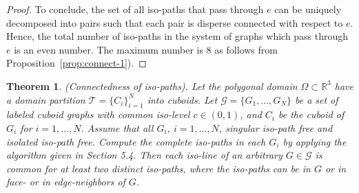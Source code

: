 \documentclass[a4paper,11pt]{article}
\newtheorem{theorem}{Theorem}[section]
\begin{document}
\begin{proof}
To conclude, the set of all iso-paths that pass through $e$ can be uniquely decomposed into pairs
such that each pair is disperse connected with respect to $e$. Hence, the total number of iso-paths in
the system of graphs which pass through $e$ is an even number. The maximum number is 8 as follows
from Proposition~\ref{prop:connect-1}).
\end{proof}

\begin{theorem}\label{thm:connect-4}(Connectedness of iso-paths).
Let the polygonal domain $\Omega\subset\mathbb{R}^3$ have a domain partition $\mathcal{T}=\{C_i\}_{i=1}^N$
into cuboids. Let $\mathcal{G}=\{G_1,\ldots,G_N\}$ be a set of labeled
cuboid graphs with common iso-level $c\in (0,1)$, and $C_i$ be the cuboid of $G_i$ for $i=1,\ldots,N$.
Assume that all $G_i$, $i=1,\ldots,N$, singular iso-path free and isolated iso-path free.
Compute the complete iso-paths in each $G_i$ by applying the algorithm given in Section 5.4.
Then each iso-line of an arbitrary $G\in \mathcal{G}$ is common for at least two distinct iso-paths, where
the iso-paths can be in $G$ or in face- or in edge-neighbors of $G$.
\end{theorem}
\end{document}
